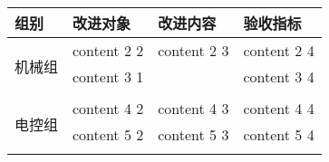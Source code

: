 
\begin{longtable}{ X | X | X | X |}

    \hline

    \endfoot
    
    \rowcolor{tabhdcolor}

        组别 &
        改进对象 &
        改进内容 &
        验收指标\\

    \hline

    \endhead

        \multirow{3}{*}{机械组} &
        content 2 2 &
        content 2 3 &
        content 2 4\\
        
        &
        content 3 1 &
        &
        content 3 4 \\

        &
        &
        &
        \\
        
    \hline
    
        \multirow{3}{*}{电控组} &
        content 4 2 &
        content 4 3 &
        content 4 4 \\

    
        &
        content 5 2 &
        content 5 3 &
        content 5 4 \\

        &
        &
        &
        \\
        
    \hline
    

\end{longtable}

